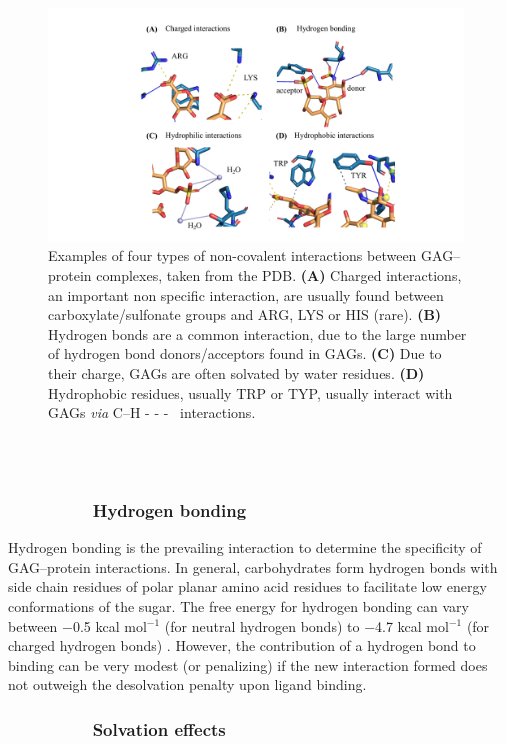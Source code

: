 \documentclass[journal=jctcce,manuscript=article]{achemso}
\begin{document}
{\begin{figure}[bl!]
    \centering
    \includegraphics[width=11cm]{interactions.pdf}
    \caption{Examples of four types of non-covalent interactions between GAG--protein complexes, taken from the PDB. \textbf{(A)} Charged interactions, an important non specific interaction, are usually found between carboxylate/sulfonate groups and ARG, LYS or HIS (rare). \textbf{(B)} Hydrogen bonds are a common interaction, due to the large number of hydrogen bond donors/acceptors found in GAGs. \textbf{(C)} Due to their charge, GAGs are often solvated by water residues. \textbf{(D)} Hydrophobic residues, usually TRP or TYP, usually interact with GAGs \textit{via} C--H - - - \textpi~interactions.}
    \label{fig:interactions}
\end{figure}
\\
\\
\subsubsection*{~~~~~~~~~Hydrogen bonding}

Hydrogen bonding is the prevailing interaction to determine the specificity of \ac{GAG}--protein interactions.\cite{Taroni2000AnalysisSites} 
In general, carbohydrates form hydrogen bonds with side chain residues of polar planar amino acid residues to facilitate low energy conformations of the sugar.\cite{Malik2007SequenceNetwork, Quiocho1989Protein-carbohydrateFeatures}  
The free energy for hydrogen bonding can vary between −0.5 kcal mol$^{-1}$ (for neutral hydrogen bonds) to −4.7 kcal mol$^{-1}$ (for charged hydrogen bonds) \cite{Davis1997HydrogenHypothesis}. However, the contribution of a hydrogen bond to binding can be very modest (or penalizing) if the new interaction formed does not outweigh the desolvation penalty upon ligand binding. \cite{H.Williams1998AspectsInteractions}

\subsubsection*{~~~~~~~~~Solvation effects}

}
\end{document}
